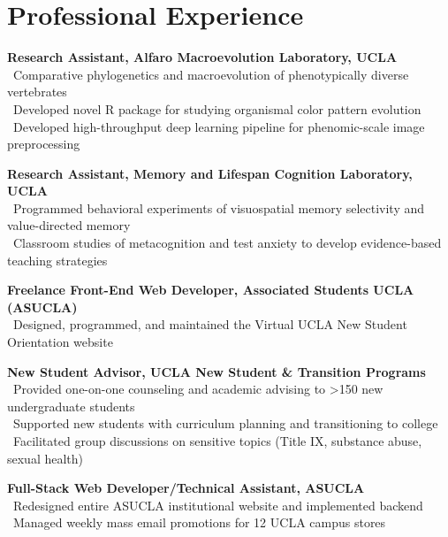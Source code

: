 \section*{Professional Experience}
\textbf{Research Assistant, Alfaro Macroevolution Laboratory, UCLA}\\
\textendash\ Comparative phylogenetics and macroevolution of phenotypically diverse vertebrates\\
\textendash\ Developed novel R package for studying organismal color pattern evolution\\
\textendash\ Developed high-throughput deep learning pipeline for phenomic-scale image preprocessing

\pubspace

\textbf{Research Assistant, Memory and Lifespan Cognition Laboratory, UCLA}\\
\textendash\ Programmed behavioral experiments of visuospatial memory selectivity and value-directed memory\\
\textendash\ Classroom studies of metacognition and test anxiety to develop evidence-based teaching strategies

\pubspace

\textbf{Freelance Front-End Web Developer, Associated Students UCLA (ASUCLA)}\\
\textendash\ Designed, programmed, and maintained the Virtual UCLA New Student Orientation website

\pubspace

\textbf{New Student Advisor, UCLA New Student \& Transition Programs}\\
\textendash\ Provided one-on-one counseling and academic advising to >150 new undergraduate students\\
\textendash\ Supported new students with curriculum planning and transitioning to college\\
\textendash\ Facilitated group discussions on sensitive topics (Title IX, substance abuse, sexual health)

\newpage

\textbf{Full-Stack Web Developer/Technical Assistant, ASUCLA}\\
\textendash\ Redesigned entire ASUCLA institutional website and implemented backend\\
\textendash\ Managed weekly mass email promotions for 12 UCLA campus stores

\pubspace

